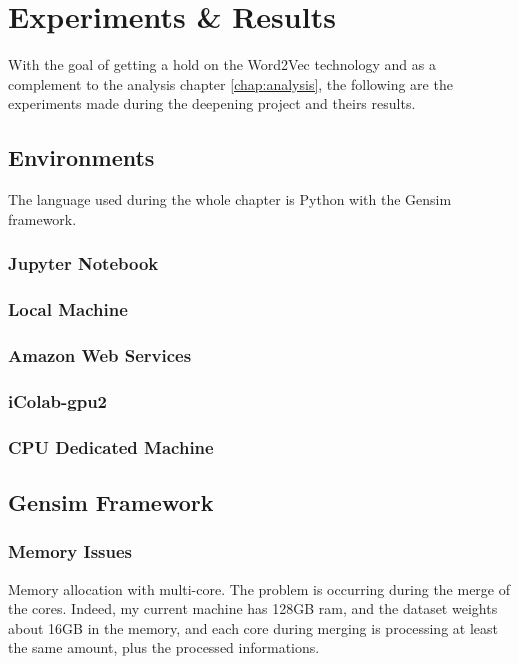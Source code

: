 

\chapter{Experiments \& Results}
\label{chap:experiments-results}
With the goal of getting a hold on the Word2Vec technology and as a complement to the analysis chapter \ref{chap:analysis}, the following are the experiments made during the deepening project and theirs results.

\section{Environments}
The language used during the whole chapter is Python with the Gensim framework.

\subsection{Jupyter Notebook}


\subsection{Local Machine}
\subsection{Amazon Web Services}
\subsection{iColab-gpu2}
\subsection{CPU Dedicated Machine}


\section{Gensim Framework}


\subsection{Memory Issues}
Memory allocation with multi-core. The problem is occurring during the merge of the cores. Indeed, my current machine has 128GB ram, and the dataset weights about 16GB in the memory, and each core during merging is processing at least the same amount, plus the processed informations.\\ 

